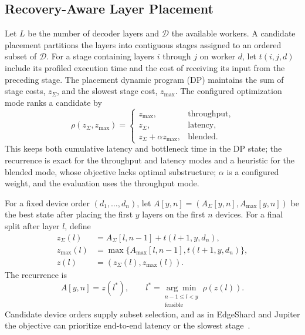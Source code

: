 \subsection{Recovery-Aware Layer Placement}\label{sec:design:dp}

Let $L$ be the number of decoder layers and $\mathcal{D}$ the available workers.  A
candidate placement partitions the layers into contiguous stages assigned to
an ordered subset of $\mathcal{D}$.  For a stage containing layers $i$ through $j$ on
worker $d$, let $t(i,j,d)$ include its profiled execution time and the cost of
receiving its input from the preceding stage.  The placement dynamic program (DP) maintains the
sum of stage costs, $z_{\Sigma}$, and the slowest stage cost, $z_{\max}$.  The
configured optimization mode ranks a candidate by
\begin{equation}\label{eq:rank}
  \rho(z_{\Sigma},z_{\max})=
  \begin{cases}
    z_{\max}, & \text{throughput},\\
    z_{\Sigma}, & \text{latency},\\
    z_{\Sigma}+\alpha z_{\max}, & \text{blended}.
  \end{cases}
\end{equation}
This keeps both cumulative latency and bottleneck time in the DP state; the
recurrence is exact for the throughput and latency modes and a heuristic for
the blended mode, whose objective lacks optimal substructure; $\alpha$ is a
configured weight, and the evaluation uses the throughput mode.

For a fixed device order $(d_1,\ldots,d_n)$, let
$A[y,n]=(A_{\Sigma}[y,n],A_{\max}[y,n])$ be the best state after placing the
first $y$ layers on the first $n$ devices.  For a final split after layer
$l$, define
\begin{align*}
  z_{\Sigma}(l) &= A_{\Sigma}[l,n-1]+t(l+1,y,d_n),\\
  z_{\max}(l) &= \max\{A_{\max}[l,n-1],t(l+1,y,d_n)\},\\
  z(l) &= (z_{\Sigma}(l),z_{\max}(l)).
\end{align*}
The recurrence is
\begin{equation}\label{eq:dp}
  A[y,n]=z(l^*),\qquad
  l^*=\underset{\substack{n-1\leq l<y\\\text{feasible}}}
  {\arg\min}\;\rho\!\left(z(l)\right).
\end{equation}
Candidate device orders supply subset selection, and as in EdgeShard and
Jupiter the objective can prioritize end-to-end latency or the slowest
stage~\cite{zhang2024edgeshard,ye2025jupiter}.

